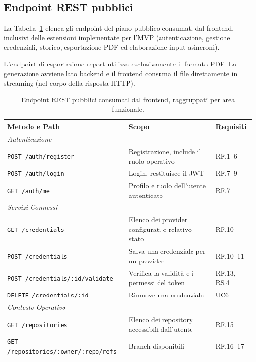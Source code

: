 \documentclass[11pt,a4paper]{article}
\begin{document}
\subsection{Endpoint REST pubblici}

La Tabella~\ref{tab:fe-endpoint} elenca gli endpoint del piano pubblico consumati dal frontend, inclusivi delle estensioni implementate per l'MVP (autenticazione, gestione credenziali, storico, esportazione PDF ed elaborazione input asincroni).

L'endpoint di esportazione report utilizza esclusivamente il formato PDF. La generazione avviene lato backend e il frontend consuma il file direttamente in streaming (nel corpo della risposta HTTP).

\begin{table}[H]
\centering
\caption{Endpoint REST pubblici consumati dal frontend, raggruppati per area funzionale.}
\label{tab:fe-endpoint}
\vspace{2mm}
\renewcommand{\arraystretch}{1.15}
\begin{tabularx}{\textwidth}{|X|X|l|}
\hline
\textbf{Metodo e Path} & \textbf{Scopo} & \textbf{Requisiti} \\ \hline
\multicolumn{3}{|l|}{\textit{Autenticazione}} \\ \hline
\texttt{POST /auth/register} & Registrazione, include il ruolo operativo & RF.1--6 \\ \hline
\texttt{POST /auth/login} & Login, restituisce il JWT & RF.7--9 \\ \hline
\texttt{GET /auth/me} & Profilo e ruolo dell'utente autenticato & RF.7 \\ \hline
\multicolumn{3}{|l|}{\textit{Servizi Connessi}} \\ \hline
\texttt{GET /credentials} & Elenco dei provider configurati e relativo stato & RF.10 \\ \hline
\texttt{POST /credentials} & Salva una credenziale per un provider & RF.10--11 \\ \hline
\texttt{POST /credentials/:id/validate} & Verifica la validità e i permessi del token & RF.13, RS.4 \\ \hline
\texttt{DELETE /credentials/:id} & Rimuove una credenziale & UC6 \\ \hline
\multicolumn{3}{|l|}{\textit{Contesto Operativo}} \\ \hline
\texttt{GET /repositories} & Elenco dei repository accessibili dall'utente & RF.15 \\ \hline
\texttt{GET /repositories/\allowbreak{}:owner/\allowbreak{}:repo/refs} & Branch disponibili & RF.16--17 \\ \hline

\end{tabularx}
\end{table}
\end{document}
